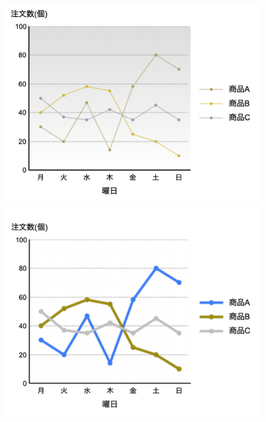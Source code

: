 \begin{figure}[H]
\begin{minipage}[b]{.49\columnwidth}
        \centering
        \includegraphics[keepaspectratio,width=\textwidth]{../../10_UniversalDesign/no2_line_CC_D.png}
    \end{minipage}
    \begin{minipage}[b]{.49\columnwidth}
        \centering
        \includegraphics[keepaspectratio,width=\textwidth]{../../10_UniversalDesign/no2_line_RC_D.png}
    \end{minipage}
    \begin{minipage}[b]{.49\columnwidth}
        \centering

\end{minipage}
\end{figure}
